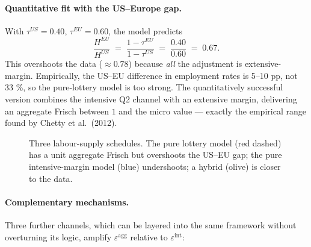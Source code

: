 \documentclass[11pt,a4paper]{article}
\begin{document}
\paragraph{Quantitative fit with the US--Europe gap.} With $\tau^{US}=0.40$, $\tau^{EU}=0.60$, the model predicts
\[
\frac{H^{EU}}{H^{US}}\;=\;\frac{1-\tau^{EU}}{1-\tau^{US}}\;=\;\frac{0.40}{0.60}\;=\;0.67.
\]
This overshoots the data ($\approx 0.78$) because \emph{all} the adjustment is extensive-margin. Empirically, the US--EU difference in employment rates is 5--10 pp, not 33 \%, so the pure-lottery model is too strong. The quantitatively successful version combines the intensive Q2 channel with an extensive margin, delivering an aggregate Frisch between $1$ and the micro value --- exactly the empirical range found by Chetty et al.\ (2012).

\begin{figure}[ht]
\centering
{}
\caption{\small Three labour-supply schedules. The pure lottery model (red dashed) has a unit aggregate Frisch but overshoots the US--EU gap; the pure intensive-margin model (blue) undershoots; a hybrid (olive) is closer to the data.}
\label{fig:lotteries}
\end{figure}

\paragraph{Complementary mechanisms.}
Three further channels, which can be layered into the same framework without overturning its logic, amplify $\varepsilon^{\text{agg}}$ relative to $\varepsilon^{\text{int}}$:
\end{document}
